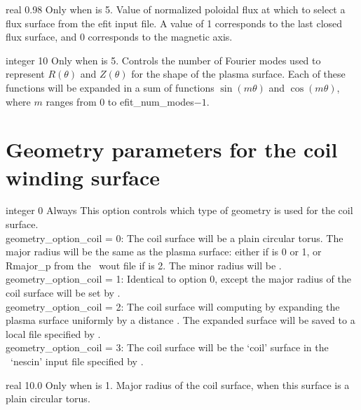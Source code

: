 \myhrule

{real}
{0.98}
{Only when  is 5.}
{Value of normalized poloidal flux at which to select a flux surface from the {\ttfamily efit} input file.
A value of 1 corresponds to the last closed flux surface, and 0 corresponds to the magnetic axis.}

\myhrule

{integer}
{10}
{Only when  is 5.}
{Controls the number of Fourier modes used to represent $R(\theta)$ and $Z(\theta)$ for the shape of
the plasma surface. Each of these functions will be expanded in a sum of functions $\sin(m\theta)$ and $\cos(m\theta)$,
where $m$ ranges from 0 to {\ttfamily efit\_num\_modes}$-1$.}

\section{Geometry parameters for the coil winding surface}

{integer}
{0}
{Always}
{This option controls which type of geometry is used for the coil surface.\\

{\ttfamily geometry\_option\_coil} = 0: The coil surface will be a plain circular torus. The major radius will be the 
same as the plasma surface: either  if  is 0 or 1, or {\ttfamily Rmajor\_p} from the \vmec~{\ttfamily wout} file
if   is 2.
     The minor radius will be .\\

{\ttfamily geometry\_option\_coil} = 1: Identical to option 0, except the major radius of the coil surface will be set by .\\

{\ttfamily geometry\_option\_coil} = 2: The coil surface will computing by expanding the plasma surface uniformly by a distance . The expanded surface will be saved to a local file specified by . \\

{\ttfamily geometry\_option\_coil} = 3: The coil surface will be the `coil' surface in the \nescoil~`nescin' input file specified by .
}

\myhrule

{real}
{10.0}
{Only when  is 1.}
{Major radius of the coil surface, when this surface is a plain circular torus.}

